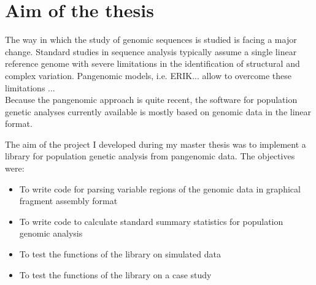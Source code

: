 
\chapter{Aim of the thesis} %

\label{Chapter4} %



The way in which the study of genomic sequences is studied is facing a major change. Standard studies in sequence analysis typically assume a single linear reference genome with severe limitations in the identification of structural and complex variation. Pangenomic models, i.e. ERIK... allow to overcome these limitations  ... \\


Because the pangenomic approach is quite recent, the software for population genetic analyses currently available is mostly based on genomic data in the linear format.  


The aim of the project I developed during my master thesis was to implement a library for population genetic analysis from pangenomic data. The objectives were: 

\begin{itemize}
    \item To write code for parsing variable regions of the genomic data in graphical fragment assembly format 
    \item To write code to calculate standard summary statistics for population genomic analysis 
    \item To test the functions of the library on simulated data
    \item To test the functions of the library on a case study
\end{itemize}




